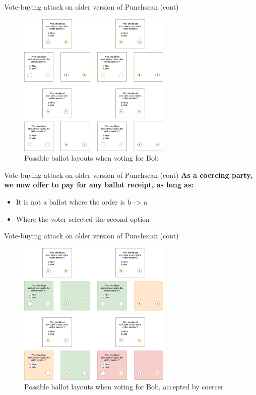 \documentclass{beamer}
\begin{document}
\begin{frame}{Vote-buying attack on older version of Punchscan (cont)}
	\begin{figure}
		\centering
		\includegraphics[width=0.65\textwidth]{../resources/vote_buying_split.drawio.png}
		\caption{Possible ballot layouts when voting for Bob}
	\end{figure}
\end{frame}

\begin{frame}{Vote-buying attack on older version of Punchscan (cont)}
	\textbf{As a coercing party, we now offer to pay for any ballot receipt, as long as:}
	\begin{itemize}
		\item It is not a ballot where the order is b -> a
		\item Where the voter selected the second option
	\end{itemize}
\end{frame}

\begin{frame}{Vote-buying attack on older version of Punchscan (cont)}
	\begin{figure}
		\centering
		\includegraphics[width=0.65\textwidth]{../resources/vote_buying_split_highlighted.drawio.png}
		\caption{Possible ballot layouts when voting for Bob, accepted by coercer}
	\end{figure}
\end{frame}
\end{document}
